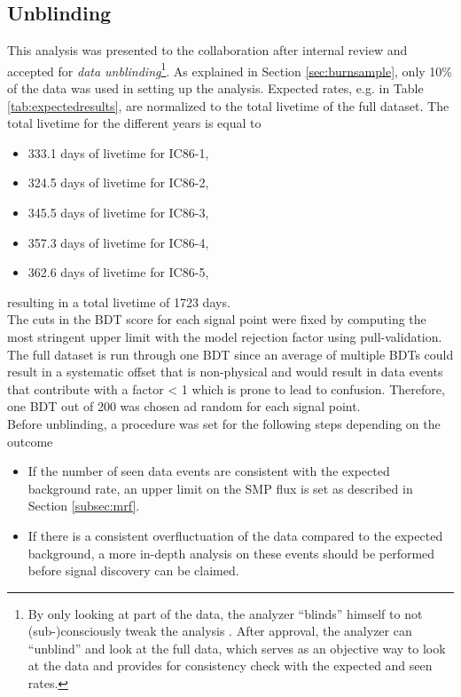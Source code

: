 \subsection{Unblinding}
This analysis was presented to the collaboration after internal review and accepted for \textit{data unblinding}\footnote{By only looking at part of the data, the analyzer ``blinds'' himself to not (sub-)consciously tweak the analysis \cite{Roodman:2003rw}. After approval, the analyzer can ``unblind'' and look at the full data, which serves as an objective way to look at the data and provides for consistency check with the expected and seen rates.}. As explained in Section \ref{sec:burnsample}, only 10\% of the data was used in setting up the analysis. Expected rates, e.g. in Table \ref{tab:expectedresults}, are normalized to the total livetime of the full dataset. The total livetime for the different years is equal to
\vspace{2mm}
\begin{itemize}
\item 333.1 days of livetime for IC86-1,
\item 324.5 days of livetime for IC86-2,
\item 345.5 days of livetime for IC86-3,
\item 357.3 days of livetime for IC86-4,
\item 362.6 days of livetime for IC86-5,
\end{itemize}
\vspace{2mm}

\noindent resulting in a total livetime of 1723 days.\\

\noindent The cuts in the BDT score for each signal point were fixed by computing the most stringent upper limit with the model rejection factor using pull-validation. The full dataset is run through one BDT since an average of multiple BDTs could result in a systematic offset that is non-physical and would result in data events that contribute with a factor < 1 which is prone to lead to confusion. Therefore, one BDT out of 200 was chosen ad random for each signal point.\\

\noindent Before unblinding, a procedure was set for the following steps depending on the outcome 
\vspace{2mm}
\begin{itemize}
\item If the number of seen data events are consistent with the expected background rate, an upper limit on the SMP flux is set as described in Section \ref{subsec:mrf}.
\item If there is a consistent overfluctuation of the data compared to the expected background, a more in-depth analysis on these events should be performed before signal discovery can be claimed.
\end{itemize}
\vspace{2mm}

